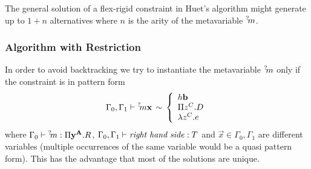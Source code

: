The general solution of a flex-rigid constraint in Huet's algorithm might
generate up to $1 + n$ alternatives where $n$ is the arity of the metavariable
${{}^? \kern-0.2em m}$.




\subsubsection{Algorithm with Restriction}
In order to avoid backtracking we try to instantiate the metavariable ${{}^? \kern-0.2em m}$
only if the constraint is in pattern form
$$
    \Gamma_0, \Gamma_1
    \vdash
    {{}^? \kern-0.2em m} {\mathbf x}
    \,\sim\,
    \left\{ \begin{array}{lllll} 
        h {\mathbf b}
        \\
        \Pi z^C . D
        \\
        \lambda z^C . e
     \end{array} \right.
$$
where
$\Gamma_0 \vdash {{}^? \kern-0.2em m} : \Pi {\mathbf y}^{{\mathbf A}}. R$, $\Gamma_0,
\Gamma_1 \vdash \text{\emph{right hand side}} : T$
and
$\vec x \in \Gamma_0, \Gamma_1$
are different variables (multiple occurrences of the same variable would be a
quasi pattern form). This has the advantage that most of the solutions are
unique.

